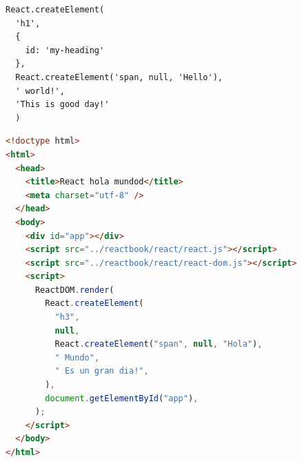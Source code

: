 \begin{lstlisting}[language=html]
  React.createElement(
  'h1',
  {
    id: 'my-heading'
  },
  React.createElement('span, null, 'Hello'),
  ' world!',
  'This is good day!'
  )
\end{lstlisting}

\begin{lstlisting}[language=html]
   <!doctype html>
<html>
  <head>
    <title>React hola mundod</title>
    <meta charset="utf-8" />
  </head>
  <body>
    <div id="app"></div>
    <script src="../reactbook/react/react.js"></script>
    <script src="../reactbook/react/react-dom.js"></script>
    <script>
      ReactDOM.render(
        React.createElement(
          "h3",
          null,
          React.createElement("span", null, "Hola"),
          " Mundo",
          " Es un gran dia!",
        ),
        document.getElementById("app"),
      );
    </script>
  </body>
</html>
\end{lstlisting}
